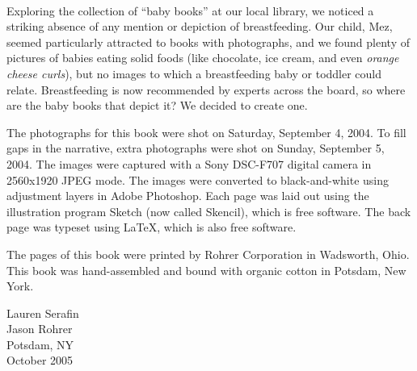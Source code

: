 \documentclass[12pt]{article}
\begin{document}
\thispagestyle{empty}
{}\\
Exploring the collection of ``baby books'' at our local library, we noticed a striking absence of any mention or depiction of breastfeeding.
Our child, Mez, seemed particularly attracted to books with photographs, and we found plenty of pictures of babies eating solid foods (like chocolate, ice cream, and even {\it orange cheese curls}), but no images to which a breastfeeding baby or toddler could relate.
Breastfeeding is now recommended by experts across the board, so where are the baby books that depict it?
We decided to create one.


The photographs for this book were shot on Saturday, September 4, 2004.
To fill gaps in the narrative, extra photographs were shot on Sunday, September 5, 2004.
The images were captured with a Sony DSC-F707 digital camera in 2560x1920 JPEG mode.
The images were converted to black-and-white using adjustment layers in Adobe Photoshop.
Each page was laid out using the illustration program Sketch (now called Skencil), which is free software.
The back page was typeset using \LaTeX, which is also free software. 

The pages of this book were printed by Rohrer Corporation in Wadsworth, Ohio.
This book was hand-assembled and bound with organic cotton in Potsdam, New York.

\begin{flushright}
\parbox{2in}{Lauren Serafin\\
Jason Rohrer\\
Potsdam, NY\\
October 2005}
\end{flushright}
\end{document}

